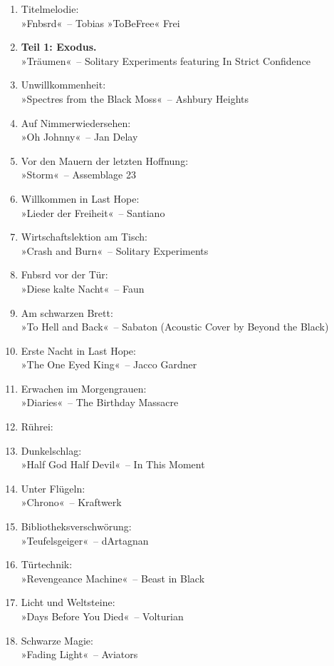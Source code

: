 \begin{enumerate}
    \item Titelmelodie:\\ »Fnbsrd«~– Tobias »ToBeFree« Frei
    \item \textbf{Teil 1: Exodus.}\\ »Träumen«~– Solitary Experiments featuring In Strict Confidence
    \item Unwillkommenheit:\\ »Spectres from the Black Moss«~– Ashbury Heights
    \item Auf Nimmerwiedersehen:\\ »Oh Johnny«~– Jan Delay
    \item Vor den Mauern der letzten Hoffnung:\\ »Storm«~– Assemblage 23
    \item Willkommen in Last Hope:\\ »Lieder der Freiheit«~– Santiano
    \item Wirtschaftslektion am Tisch:\\ »Crash and Burn«~– Solitary Experiments
    \item Fnbsrd vor der Tür:\\ »Diese kalte Nacht«~– Faun
    \item Am schwarzen Brett:\\ »To Hell and Back«~– Sabaton (Acoustic Cover by Beyond the Black)
    \item Erste Nacht in Last Hope:\\ »The One Eyed King«~– Jacco Gardner
    \item Erwachen im Morgengrauen:\\ »Diaries«~– The Birthday Massacre
    \item Rührei:\\
    \item Dunkelschlag:\\ »Half God Half Devil«~– In This Moment
    \item Unter Flügeln:\\ »Chrono«~– Kraftwerk
    \item Bibliotheksverschwörung:\\ »Teufelsgeiger«~– dArtagnan
    \item Türtechnik:\\ »Revengeance Machine«~– Beast in Black
    \item Licht und Weltsteine:\\ »Days Before You Died«~– Volturian
    \item Schwarze Magie:\\ »Fading Light«~– Aviators

\end{enumerate}
